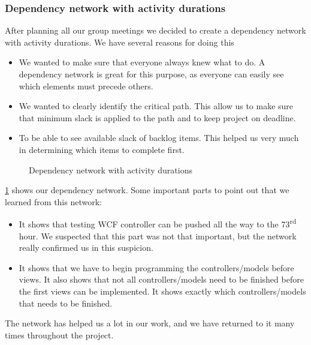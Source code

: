 \subsubsection{Dependency network with activity durations}
After planning all our group meetings we decided to create a dependency network with activity durations. We have several reasons for doing this
\begin{itemize}
	\item We wanted to make sure that everyone always knew what to do. A dependency network is great for this purpose, as everyone can easily see which elements must precede others.
	\item We wanted to clearly identify the critical path. This allow us to make sure that minimum slack is applied to the path and to keep project on deadline.
	\item To be able to see available slack of backlog items. This helped us very much in determining which items to complete first.
\end{itemize}

\begin{figure}[H]
  \caption{Dependency network with activity durations}
  \label{dependency network}
\end{figure}

\cref{dependency network} shows our dependency network.
Some important parts to point out that we learned from this network:
\begin{itemize}
	\item It shows that testing WCF controller can be pushed all the way to the 73\textsuperscript{rd} hour. We suspected that this part was not that important, but the network really confirmed us in this suspicion.
	\item It shows that we have to begin programming the controllers/models before views. It also shows that not all controllers/models need to be finished before the first views can be implemented. It shows exactly which controllers/models that needs to be finished.
\end{itemize}

The network has helped us a lot in our work, and we have returned to it many times throughout the project.